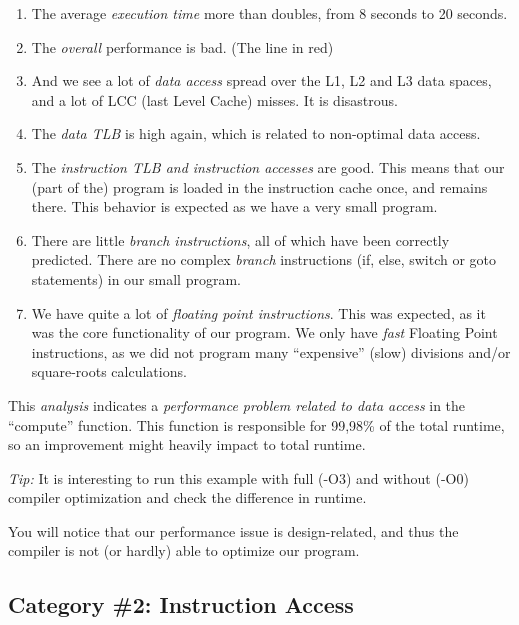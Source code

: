 \begin{enumerate}
  \item The average \emph{execution time} more than doubles, from 8 seconds to 20 seconds.
  \item The \emph{overall} performance is bad. (The line in red)
  \item And we see a lot of \emph{data access} spread over the L1, L2 and L3 data spaces, and a lot of LCC (last Level Cache) misses. It is disastrous.
  \item The \emph{data TLB} is high again, which is related to non-optimal data access.
  \item The \emph{instruction TLB and instruction accesses} are good. This means that our (part of the) program is loaded in the instruction cache once, and remains there. This behavior is expected as we have a very small program.
  \item There are little \emph{branch instructions}, all of which have been correctly predicted. There are no complex \emph{branch} instructions (if, else, switch or goto statements) in our small program.
  \item We have quite a lot of \emph{floating point instructions}. This was expected, as it was the core functionality of our program. We only have \emph{fast} Floating Point instructions, as we did not program many ``expensive'' (slow) divisions and/or square-roots calculations.
\end{enumerate}

This \emph{analysis} indicates a \emph{performance problem related to data access} in the ``compute'' function. This function is responsible for 99,98\% of the total runtime, so an improvement might heavily impact to total runtime.

\emph{Tip:} It is interesting to run this example with full (-O3) and without (-O0) compiler optimization and check the difference in runtime.

\begin{prompt}
\end{prompt}

You will notice that our performance issue is design-related, and thus the compiler is not (or hardly) able to optimize our program.

\subsection{Category \#2: Instruction Access}
\label{subsec:CAT2_Instruction_Access}


